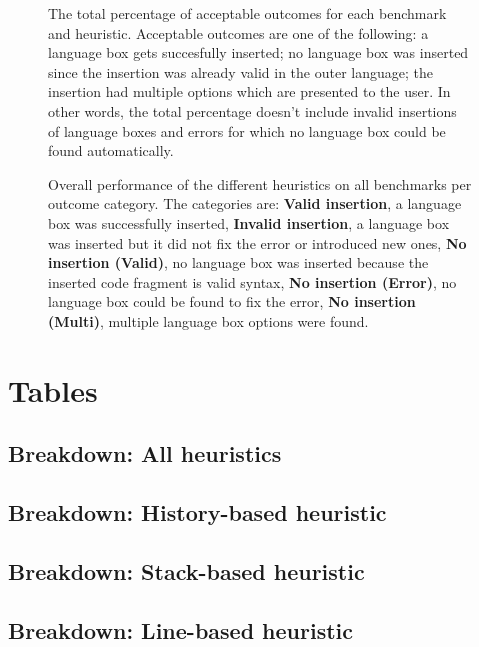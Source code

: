 \documentclass[sigplan,screen]{acmart}\settopmatter{printfolios=true,printccs=false,printacmref=false}
\begin{document}
\begin{figure}[hbt]
    
    \caption{The total percentage of acceptable outcomes for each benchmark and
    heuristic. Acceptable outcomes are one of the following: a language box
    gets succesfully inserted; no language box was inserted since the insertion
    was already valid in the outer language; the insertion had multiple options
    which are presented to the user. In other words, the total percentage
    doesn't include invalid insertions of language boxes and errors for which
    no language box could be found automatically.}
    \label{tbl_valid}
\end{figure}

\begin{figure}[hbt]
    
    \caption{Overall performance of the different
    heuristics on all benchmarks per outcome category. The categories are:
    \textbf{Valid insertion}, a language box was successfully inserted, \textbf{Invalid insertion},
    a language box was inserted but it did not fix the error or introduced new
    ones, \textbf{No insertion (Valid)}, no language box was inserted because the inserted
    code fragment is valid syntax, \textbf{No insertion (Error)}, no language box could be
    found to fix the error, \textbf{No insertion (Multi)}, multiple language box options
    were found.}
    \label{tbl_breakdown}
\end{figure}



\appendix

\section{Tables}
\subsection{Breakdown: All heuristics}

\subsection{Breakdown: History-based heuristic}

\subsection{Breakdown: Stack-based heuristic}

\subsection{Breakdown: Line-based heuristic}

\end{document}
